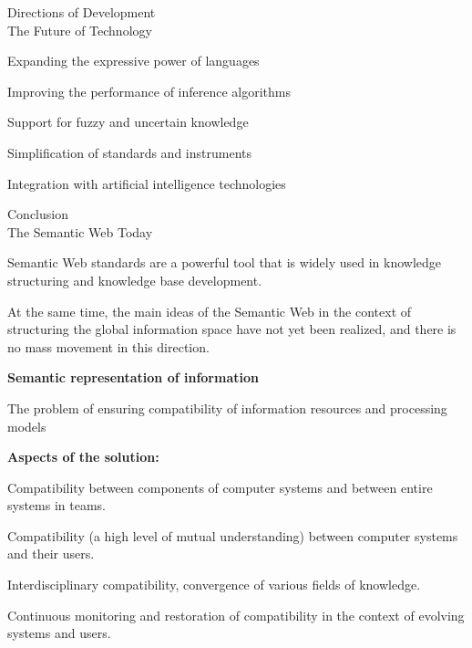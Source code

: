 \begin{frame}{Directions of Development\\The Future of Technology}
	\topline
	\justifying
	\begin{textitemize}
		\item Expanding the expressive power of languages
		\item Improving the performance of inference algorithms
		\item Support for fuzzy and uncertain knowledge
		\item Simplification of standards and instruments
		\item Integration with artificial intelligence technologies
	\end{textitemize}
\end{frame}

\begin{frame}{Conclusion\\The Semantic Web Today}
	\topline
	\justifying
	
	Semantic Web standards are a powerful tool that is widely used in knowledge structuring and knowledge base development.
	
	\bigskip
	
	At the same time, the main ideas of the Semantic Web in the context of structuring the global information space have not yet been realized, and there is no mass movement in this direction.
	
\end{frame}

\begin{frame}{}
	
	\centering
	
	\Huge
	
	\textbf{Semantic representation of information}
	
\end{frame}


\begin{frame}{The problem of ensuring compatibility of information resources and processing models}
	\topline
	\justifying
	
	\textbf{Aspects of the solution:}
	\begin{textitemize}
		\item Compatibility between components of computer systems and between entire systems in teams.
		\item Compatibility (a high level of mutual understanding) between computer systems and their users.
		\item Interdisciplinary compatibility, convergence of various fields of knowledge.
		\item Continuous monitoring and restoration of compatibility in the context of evolving systems and users.
	\end{textitemize}
	
\end{frame}


